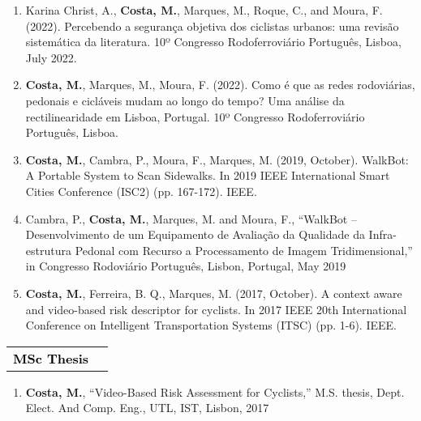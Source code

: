 \begin{enumerate}[rightmargin=1.5cm]
\itemsep0em 
\item Karina Christ, A., \textbf{Costa, M.}, Marques, M., Roque, C., and Moura, F. (2022). Percebendo a segurança objetiva dos ciclistas urbanos: uma revisão sistemática da literatura. 10º Congresso Rodoferroviário Português, Lisboa, July 2022.

\item \textbf{Costa, M.}, Marques, M., Moura, F. (2022). Como é que as redes rodoviárias, pedonais e cicláveis mudam ao longo do tempo? Uma análise da rectilinearidade em Lisboa, Portugal. 10º Congresso Rodoferroviário Português, Lisboa.

\item \textbf{Costa, M.}, Cambra, P., Moura, F., Marques, M. (2019, October). WalkBot: A Portable System to Scan Sidewalks. In 2019 IEEE International Smart Cities Conference (ISC2) (pp. 167-172). IEEE.

\item Cambra, P., \textbf{Costa, M.}, Marques, M. and Moura, F., “WalkBot – Desenvolvimento de um Equipamento de Avaliação da Qualidade da Infra-estrutura Pedonal com Recurso a Processamento de Imagem Tridimensional,” in Congresso Rodoviário Português, Lisbon, Portugal, May 2019

\item \textbf{Costa, M.}, Ferreira, B. Q., Marques, M. (2017, October). A context aware and video-based risk descriptor for cyclists. In 2017 IEEE 20th International Conference on Intelligent Transportation Systems (ITSC) (pp. 1-6). IEEE.

\end{enumerate}



\vspace{7pt}\hspace{-5pt}
\begin{tabular*}{1\textwidth}{p{} p{}}
        \textcolor{black}{\Large\textbf{MSc Thesis}} & \\
    \end{tabular*}

\begin{enumerate}[rightmargin=1.5cm]
\itemsep0em 
\item \textbf{Costa, M.}, “Video-Based Risk Assessment for Cyclists,” M.S. thesis, Dept. Elect. And Comp. Eng., UTL, IST, Lisbon, 2017

\end{enumerate}
